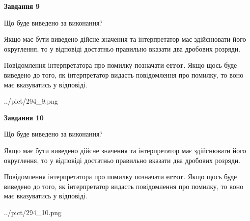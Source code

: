 \documentclass[12pt, ukrainian]{article}
\begin{document}
{\begin {Large}
{\begin {center}\textbf{Завдання 9}\end {center}}\par
Що буде виведено за виконання? \par

Якщо має бути виведено дійсне значення та інтерпретатор має здійснювати його округлення, 
то у відповіді достатньо правильно вказати два дробових розряди.

Повідомлення інтерпретатора про помилку позначати \textbf{error}.
Якщо щось буде виведено до того, як інтерпретатор видасть повідомлення про помилку, 
то воно має вказуватись у відповіді. \par

\begin{center}
	{../pict/294_9.png}
\end{center}
\newpage

{\begin {center}\textbf{Завдання 10}\end {center}}\par
Що буде виведено за виконання? \par

Якщо має бути виведено дійсне значення та інтерпретатор має здійснювати його округлення, 
то у відповіді достатньо правильно вказати два дробових розряди.

Повідомлення інтерпретатора про помилку позначати \textbf{error}.
Якщо щось буде виведено до того, як інтерпретатор видасть повідомлення про помилку, 
то воно має вказуватись у відповіді. \par

\begin{center}
	{../pict/294_10.png}
\end{center}
\newpage

\end {Large}}
\end{document}
